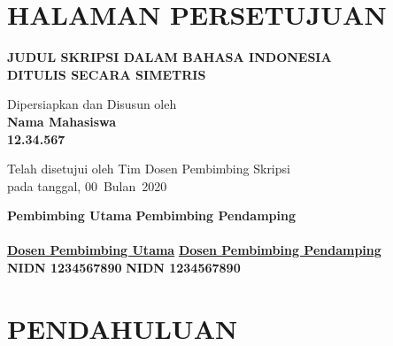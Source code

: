 \documentclass[oneside,listof=totoc]{scrbook}
\newcommand\tab[1][1cm]{\hspace*{#1}}
\newcommand{\JudulProposal}{JUDUL SKRIPSI DALAM BAHASA INDONESIA \\ DITULIS SECARA SIMETRIS}
\newcommand{\NamaMahasiswa}{Nama Mahasiswa}
\newcommand{\NIM}{12.34.567}
\newcommand{\DosenPembimbingUtama}{Dosen Pembimbing Utama}
\newcommand{\NIDNDosenPembimbingUtama}{NIDN 1234567890}
\newcommand{\DosenPembimbingPendamping}{Dosen Pembimbing Pendamping}
\newcommand{\NIDNDosenPembimbingPendamping}{NIDN 1234567890}
\newcommand{\TanggalPembuatan}{00}
\newcommand{\BulanPembuatan}{Bulan}
\newcommand{\TahunPembuatan}{2020}
\begin{document}
\chapter{HALAMAN PERSETUJUAN}

\vspace{1.0cm}

\begin{center}
  \normalsize{\textbf{\JudulProposal}}
\end{center}

\vspace{3.0cm}

\begin{center}
  \normalsize{Dipersiapkan dan Disusun oleh}\\
  \textbf{\NamaMahasiswa}\\
  \textbf{\NIM}
\end{center}

\vspace{3.0cm}

\begin{center}
  \linespread{1.0}
  \normalsize{Telah disetujui oleh Tim Dosen Pembimbing Skripsi\\
  pada tanggal, \TanggalPembuatan\ \BulanPembuatan\ \TahunPembuatan}
\end{center}

\vspace{3.0cm}

\begin{minipage}{\textwidth}
  \tab[0cm]\textbf{Pembimbing Utama} \tab[4.5cm] \textbf{Pembimbing Pendamping}\\
  \vspace{1.3cm}\\
  \linespread{1.0}
  \normalsize{\tab[0cm]\textbf{\underline{\DosenPembimbingUtama}} \tab[3.4cm] \textbf{\underline{\DosenPembimbingPendamping}}\\
  \tab[0cm]\textbf{\NIDNDosenPembimbingUtama} \tab[4.80cm] \textbf{\NIDNDosenPembimbingPendamping}}
\end{minipage}

\tableofcontents
\listoftables
\listoffigures

\mainmatter
\pagestyle{fancy}\fancyhf{}\fancyhead[R]{\thepage}
\renewcommand{\headrulewidth}{0pt}

\chapter{PENDAHULUAN}
\end{document}
